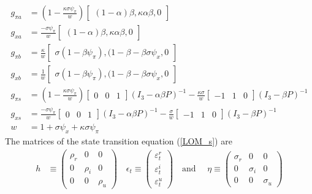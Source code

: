 \documentclass[11pt]{article}
\renewcommand{\[}{\begin{equation}}
\renewcommand{\]}{\end{equation}}
\begin{document}
\begin{align}
g_{\pi a} & =(1-\frac{\kappa\sigma\psi_{\pi}}{w} )  \begin{bmatrix}(1-\alpha)\beta, \kappa\alpha\beta, 0 \end{bmatrix} \\
g_{x a} & =  \frac{-\sigma\psi_{\pi}}{w} \begin{bmatrix}(1-\alpha)\beta, \kappa\alpha\beta, 0 \end{bmatrix}\\
g_{\pi b} & = \frac{\kappa}{w} \begin{bmatrix}\sigma(1-\beta\psi_{\pi}), (1-\beta-\beta\sigma\psi_x, 0 \end{bmatrix}\\
g_{x b} & = \frac{1}{w} \begin{bmatrix}\sigma(1-\beta\psi_{\pi}), (1-\beta-\beta\sigma\psi_x, 0 \end{bmatrix} \\
g_{\pi s} & = (1-\frac{\kappa\sigma\psi_{\pi}}{w} )\begin{bmatrix} 0&0&1 \end{bmatrix} (I_3 - \alpha\beta P)^{-1} -\frac{\kappa\sigma}{w}\begin{bmatrix} -1&1&0 \end{bmatrix} (I_3 -\beta P)^{-1}\\
g_{x s} & =  \frac{-\sigma\psi_{\pi}}{w} \begin{bmatrix} 0&0&1 \end{bmatrix}(I_3 - \alpha\beta P)^{-1}  -\frac{\sigma}{w}\begin{bmatrix} -1&1&0 \end{bmatrix}(I_3 -\beta P)^{-1}\\
w & = 1+\sigma\psi_x +\kappa\sigma\psi_{\pi}
\end{align}
The matrices of the state transition equation (\ref{LOM_s}) are
 \begin{align}
 h  & \equiv \begin{pmatrix} \rho_r & 0 & 0 \\ 0& \rho_i & 0 \\ 0&0& \rho_u 
 \end{pmatrix}  \quad 
 \epsilon_t \equiv \begin{pmatrix}\varepsilon_t^{r} \\ \varepsilon_t^{i}  \\ \varepsilon_t^{u} 
 \end{pmatrix}  \quad  \text{and } \quad \eta  \equiv \begin{pmatrix} \sigma_r & 0 & 0 \\ 0& \sigma_i & 0 \\ 0&0& \sigma_u 
 \end{pmatrix} 
 \end{align}
\end{document}
